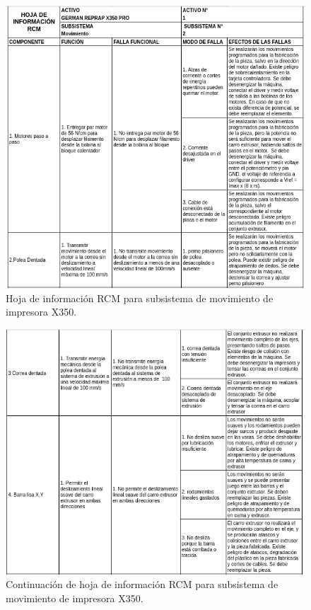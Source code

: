 \begin{figure}[H]
\centering
\includegraphics[scale=0.8]{images/amef21.png}
\caption{Hoja de información RCM para subsistema de movimiento de impresora X350.}
\end{figure}
\begin{figure}[H]
\centering
\includegraphics[scale=0.8]{images/amef22.png}
\caption{Continuación de hoja de información RCM para subsistema de movimiento de impresora X350.}
\end{figure}

